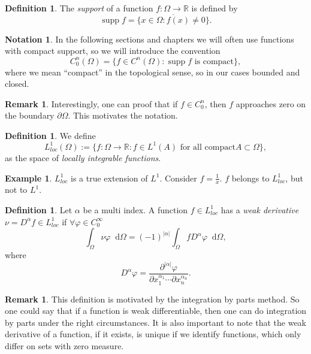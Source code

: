 \documentclass[12pt,a4paper,twoside, open=right]{scrreprt}
\theoremstyle{definition}
\newtheorem{rem}[auf]{Remark}
\newtheorem{defn}[auf]{Definition}
\newtheorem{bsp}[auf]{Example}
\newtheorem{notation}[auf]{Notation}
\theoremstyle{plain}
\DeclareMathOperator{\supp}{supp} %
\newcommand{\abs}[1]{\left\vert #1\right\vert}
\newcommand{\rr}{\mathbb{R}}
\newcommand{\D}{\mathop{}\!\mathrm{d}}
\begin{document}
\begin{defn}
    The \emph{support} of a function $f\colon \Omega\to\rr$ is defined by 
    \begin{equation}
        \supp f = \overline{\{x\in\Omega\colon f(x)\neq 0\}}.
    \end{equation}
\end{defn}
\begin{notation}
    In the following sections and chapters we will often use functions with compact support, so we will introduce the convention
    \begin{equation}
        C^n_0(\Omega)=\{f\in C^n(\Omega)\colon \supp f \text{ is compact} \},
    \end{equation}
    where we mean \enquote{compact} in the topological sense, so in our cases bounded and closed.
\end{notation}
\begin{rem}
    Interestingly, one can proof that if $f\in C^n_0$, then $f$ approaches zero on the boundary $\partial\Omega$. This motivates the notation.
\end{rem}
\begin{defn}
    We define 
    \begin{equation}
        L^1_{loc}(\Omega):=\{f\colon\Omega\to\rr\colon f\in L^1(A) \text{ for all compact} A\subset\Omega \},
    \end{equation}
    as the space of \emph{locally integrable functions}.
\end{defn}
\begin{bsp}
    $L^1_{loc}$ is a true extension of $L^1$. Consider $f=\frac{1}{x}$. $f$ belongs to $L^1_{loc}$, but not to $L^1$. 
\end{bsp}
\begin{defn}
    \label{defn:weakderivative}
    Let $\alpha$ be a multi index. A function $f\in L^1_{loc}$ has a \emph{weak derivative} $\nu=D^\alpha f\in L^1_{loc}$ if $\forall \varphi\in C_0^\infty$
    \begin{equation}
        \int_\Omega\nu\varphi\D\Omega = (-1)^{\abs{\alpha}}\int_\Omega fD^\alpha\varphi \D\Omega,
    \end{equation}
    where 
    \begin{equation}
        D^\alpha\varphi=\frac{\partial^{\abs{\alpha}}\varphi}{\partial x_1^{\alpha_1}\dotsb\partial x_n^{\alpha_n}}.
    \end{equation}
\end{defn}
\begin{rem}
    This definition is motivated by the integration by parts method. So one could say that if a function is weak differentiable, then one can do integration by parts under the right circumstances. It is also important to note that the weak derivative of a function, if it exists, is unique if we identify functions, which only differ on sets with zero measure.
\end{rem}
\end{document}
